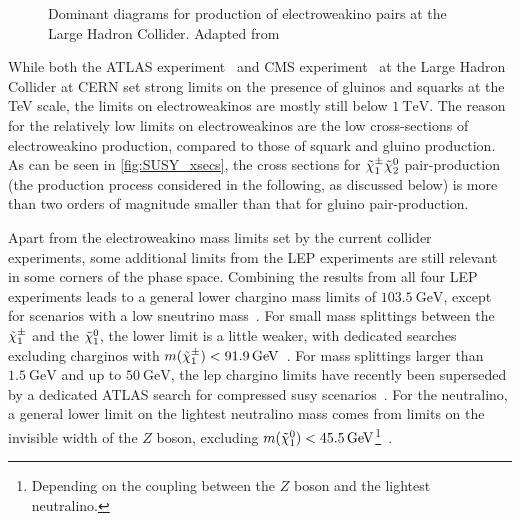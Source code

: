 \begin{figure}
\begin{subfigure}[b]{0.33\linewidth}
		\caption{\label{fig:electroweakino_production_3}}
	\end{subfigure}	
	\caption{Dominant diagrams for production of electroweakino pairs at the Large Hadron Collider. Adapted from \cite{Martin:1997ns}}\label{fig:electroweakino_production}
\end{figure}

While both the ATLAS experiment~\cite{ATLASsummary} and CMS experiment~\cite{CMSsummary} at the Large Hadron Collider at CERN set strong limits on the presence of gluinos and squarks at the TeV scale, the limits on electroweakinos are mostly still below $\SI{1}{\TeV}$. 
The reason for the relatively low limits on electroweakinos are the low cross-sections of electroweakino production, compared to those of squark and gluino production.
As can be seen in \cref{fig:SUSY_xsecs}, the cross sections for $\tilde{\chi}_1^\pm\tilde{\chi}_2^0$ pair-production (the production process considered in the following, as discussed below) is more than two orders of magnitude smaller than that for gluino pair-production.  

Apart from the electroweakino mass limits set by the current collider experiments, some additional limits from the LEP experiments are still relevant in some corners of the phase space. Combining the results from all four LEP experiments leads to a general lower chargino mass limits of $\SI{103.5}{\GeV}$, except for scenarios with a low sneutrino mass~\cite{lep_susy_results}. For small mass splittings between the $\tilde{\chi}_1^\pm$ and the $\tilde{\chi}_1^0$, the lower limit is a little weaker, with dedicated searches excluding charginos with $m(\charg) < \SI{91.9}{\GeV}$~\cite{lep_susy_results}. For mass splittings larger than $\SI{1.5}{\GeV}$ and up to $\SI{50}{\GeV}$, the \gls{lep} chargino limits have recently been superseded by a dedicated ATLAS search for compressed \gls{susy} scenarios~\cite{SUSY-2018-16}. For the neutralino, a general lower limit on the lightest neutralino mass comes from limits on the invisible width of the $Z$ boson, excluding $m(\lsp) < \SI{45.5}{\GeV}$\footnote{Depending on the coupling between the $Z$ boson and the lightest neutralino.}~\cite{pdg2020}. 

